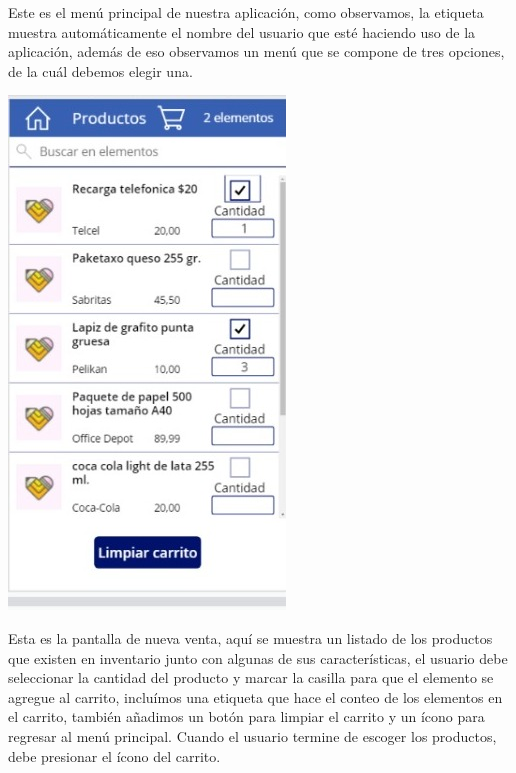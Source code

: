 \documentclass[letter,12pt]{article} %
\begin{document}
Este es el menú principal de nuestra aplicación, como observamos, la etiqueta muestra automáticamente el nombre del usuario que esté haciendo uso de la aplicación, además de eso observamos un menú que se compone de tres opciones, de la cuál debemos elegir una.\\

\begin{center} 
\includegraphics[scale=0.45]{imagenes/A03.jpeg}
\end{center} 
Esta es la pantalla de nueva venta, aquí se muestra un listado de los productos que existen en inventario junto con algunas de sus características, el usuario debe seleccionar la cantidad del producto y marcar la casilla para que el elemento se agregue al carrito, incluímos una etiqueta que hace el conteo de los elementos en el carrito, también añadimos un botón para limpiar el carrito y un ícono para regresar al menú principal. Cuando el usuario termine de escoger los productos, debe presionar el ícono del carrito.\\
\end{document}
